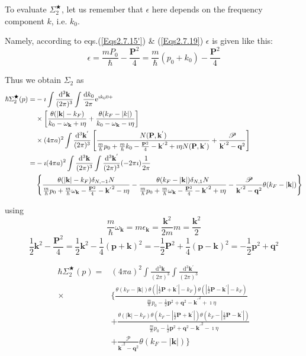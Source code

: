 To evaluate $\Sigma_2^{\bigstar}$, let us remember that $\epsilon$ here depends on the frequency component $k$, i.e. $k_0$.

Namely, according to eqs.(\ref{Eqs2.7.15'}) \& (\ref{Eqs2.7.19}) $\epsilon$ is given like this:
\[ \epsilon = \frac{m P_0}{\hbar} - \frac{\mathbf{P}^2}{4} = \frac{m}{\hbar}(p_0+k_0)-\frac{\mathbf{P}^2}{4}\]

Thus we obtain $\Sigma_2$ as
\[ \allowdisplaybreaks \begin{split}
\hbar\Sigma_2^{\bigstar}(p)=&-\imath \int \frac{\mathrm{d}^3\mathbf{k}}{(2\pi)^3} \int \frac{\mathrm{d}k_0}{2\pi}\mathrm{e}^{\imath k_0 0 +}\\
& \times \left[ \frac{\theta(|\mathbf{k}|-k_F)}{k_0-\omega_{\mathbf{k}} +\imath \eta} + \frac{\theta(k_F-|k|)}{k_0-\omega_{\mathbf{k}}-\imath \eta} \right]\\
&\times (4\pi a)^2 \int \frac{\mathrm{d}^3 \mathbf{k}^{'}}{(2\pi)^3}\left[ \frac{N(\mathbf{P},\mathbf{k}^{'})}{\frac{m}{\hbar}p_0 + \frac{m}{\hbar} k_0 - \frac{\mathbf{P}^2}{4} - {\mathbf{k}^{'}}^2+\imath \eta N(\mathbf{P},\mathbf{k}^{'})} + \frac{\mathscr{P}}{{\mathbf{k}^{'}}^2-\mathbf{q}^2} \right]\\
=& -\imath (4\pi a)^2 \int \frac{\mathrm{d}^3\mathbf{k}}{(2\pi)^3}  \int \frac{\mathrm{d}^3\mathbf{k}^{'}}{(2\pi)^3} (-2\pi \imath) \frac{1}{2\pi}\\
&\left\{ \frac{\theta(|\mathbf{k}|-k_F)\delta_{N,-1} N}{\frac{m}{\hbar}p_0+\frac{m}{\hbar}\omega_{\mathbf{k}}-\frac{\mathbf{P}^2}{4}-{\mathbf{k}^{'}}^2-\imath \eta} - \frac{\theta(k_F-|\mathbf{k}|)\delta_{N,1} N}{\frac{m}{\hbar}p_0+\frac{m}{\hbar}\omega_{\mathbf{k}}-\frac{\mathbf{P}^2}{4}-{\mathbf{k}^{'}}^2+\imath \eta} - \frac{\mathscr{P}}{{\mathbf{k}^{'}}^2-\mathbf{q}^2}\theta(k_F-|\mathbf{k}|) \right\}
\end{split} \]

using
\[ \frac{m}{\hbar}\omega_{\mathbf{k}} = m\epsilon_{\mathbf{k}} = \frac{\mathbf{k}^2}{2m}m = \frac{\mathbf{k}^2}{2}\]
\[ \frac{1}{2}\mathbf{k}^2 - \frac{\mathbf{P}^2}{4} = \frac{1}{2}\mathbf{k}^2-\frac{1}{4}(\mathbf{p}+\mathbf{k})^2= -\frac{1}{2}\mathbf{P}^2+\frac{1}{4}(\mathbf{p}-\mathbf{k})^2 = -\frac{1}{2}\mathbf{p}^2+\mathbf{q}^2\]

\begin{equation} \label{Eqs2.7.29} \begin{split}
\hbar \Sigma_2^{\bigstar}(p)=& (4\pi a)^2 \int \frac{\mathrm{d}^3\mathbf{k}}{(2\pi)^3}  \int \frac{\mathrm{d}^3\mathbf{k}^{'}}{(2\pi)^3} \\
\times&\{ \frac{\theta(k_F-|\mathbf{k}|)\theta(|\frac{1}{2}\mathbf{P}+\mathbf{k}^{'}|-k_F)\theta(|\frac{1}{2}\mathbf{P}-\mathbf{k}^{'}|-k_F)}{\frac{m}{\hbar}p_0-\frac{1}{2}\mathbf{p}^2+\mathbf{q}^2-{\mathbf{k}^{'}}^2+\imath \eta}\\
&+ \frac{\theta(|\mathbf{k}|-k_F)\theta(k_F-|\frac{1}{2}\mathbf{P}+\mathbf{k}^{'}|)\theta(k_F-|\frac{1}{2}\mathbf{P}-\mathbf{k}^{'}|)}{\frac{m}{\hbar}p_0-\frac{1}{2}\mathbf{p}^2+\mathbf{q}^2-{\mathbf{k}^{'}}^2-\imath \eta}\\
&+\frac{\mathscr{P}}{{\mathbf{k}^{'}}^2-\mathbf{q}^2}\theta(k_F-|\mathbf{k}|) \}
\end{split} \end{equation}


